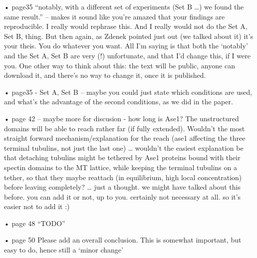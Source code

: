 

• page35 “notably, with a different set of experiments (Set B …) we found the same result.” – makes it sound like you’re amazed that your findings are reproducible. I really would rephrase this. And I really would not do the Set A, Set B, thing. But then again, as Zdenek pointed just out (we talked about it) it’s your theis. You do whatever you want. All I’m saying is that both the ‘notably’ and the Set A, Set B are very (!) unfortunate, and that  I’d change this, if I were you. One other way to think about this: the text will be public, anyone can download it, and there’s no way to change it, once it is published.

• page35 - Set A, Set B – maybe you could just state which conditions are used, and what’s the advantage of the second conditions, as we did in the paper.


• page 42 – maybe more for discusion - how long is Ase1? The unstructured domains will be able to reach rather far (if fully extended). Wouldn’t the most straight forward mechanism/explanation for the reach (ase1 affecting the three terminal tubulins, not just the last one) … wouldn’t the easiest explanation be that detaching tubulins might be tethered by Ase1 proteins bound with their spectin domains to the MT lattice, while keeping the terminal tubulins on a tether, so that they maybe reattach (in equilibrium, high local concentration) before leaving completely?
	… just a thought. we might have talked about this before. you can add it or not, up to you. certainly not necessary at all. so it’s easier not to add it :)



• page 48  “TODO”


• page 50  Please add an overall conclusion. This is somewhat important, but easy to do, hence still a ‘minor change’








